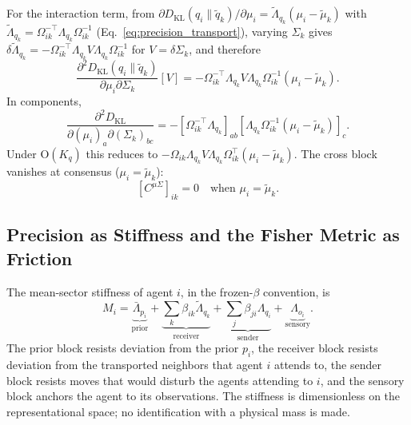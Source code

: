 For the interaction term, from $\partial D_{\mathrm{KL}}(q_i \| \tilde{q}_k)/\partial \mu_i = \tilde{\Lambda}_{q_k}(\mu_i - \tilde{\mu}_k)$ with $\tilde{\Lambda}_{q_k} = \Omega_{ik}^{-\top}\Lambda_{q_k}\Omega_{ik}^{-1}$ (Eq.~\eqref{eq:precision_transport}), varying $\Sigma_k$ gives $\delta\tilde{\Lambda}_{q_k} = -\Omega_{ik}^{-\top}\Lambda_{q_k} V \Lambda_{q_k}\Omega_{ik}^{-1}$ for $V = \delta\Sigma_k$, and therefore
\begin{equation}
\frac{\partial^2 D_{\mathrm{KL}}(q_i \| \tilde{q}_k)}{\partial \mu_i \partial \Sigma_k}[V] = -\Omega_{ik}^{-\top}\Lambda_{q_k} V \Lambda_{q_k} \Omega_{ik}^{-1} (\mu_i - \tilde{\mu}_k).
\end{equation}
In components,
\begin{equation}
\frac{\partial^2 D_{\mathrm{KL}}}{\partial(\mu_i)_a \partial(\Sigma_k)_{bc}} = -[\Omega_{ik}^{-\top}\Lambda_{q_k}]_{ab}[\Lambda_{q_k}\Omega_{ik}^{-1}(\mu_i - \tilde{\mu}_k)]_c.
\end{equation}
Under $\mathrm{O}(K_q)$ this reduces to $-\Omega_{ik}\Lambda_{q_k} V \Lambda_{q_k}\Omega_{ik}^\top(\mu_i - \tilde{\mu}_k)$. The cross block vanishes at consensus ($\mu_i = \tilde{\mu}_k$):
\begin{equation}
\boxed{[C^{\mu\Sigma}]_{ik} = 0 \quad \text{when } \mu_i = \tilde{\mu}_k.}
\label{eq:cross_block}
\end{equation}

\subsection{Precision as Stiffness and the Fisher Metric as Friction}
\label{sec:stiffness_friction}

The mean-sector stiffness of agent $i$, in the frozen-$\beta$ convention, is
\begin{equation}
M_i = \underbrace{\bar{\Lambda}_{p_i}}_{\text{prior}} + \underbrace{\sum_k \beta_{ik}\tilde{\Lambda}_{q_k}}_{\text{receiver}} + \underbrace{\sum_j \beta_{ji}\Lambda_{q_i}}_{\text{sender}} + \underbrace{\Lambda_{o_i}}_{\text{sensory}}.
\label{eq:effective_mass}
\end{equation}
The prior block resists deviation from the prior $p_i$, the receiver block resists deviation from the transported neighbors that agent $i$ attends to, the sender block resists moves that would disturb the agents attending to $i$, and the sensory block anchors the agent to its observations. The stiffness is dimensionless on the representational space; no identification with a physical mass is made.

